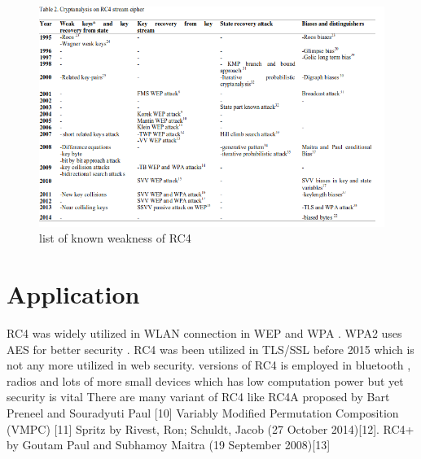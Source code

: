 \documentclass[conference]{IEEEtran}
\begin{document}
\begin{figure}
    \centering
    \includegraphics[width=\linewidth]{Screenshot_2020-09-21 (PDF) A Survey on RC4 Stream Cipher}
    \caption{list of known weakness of RC4}
    \label{fig:my_label}
\end{figure}

\section{Application}
RC4 was widely utilized in WLAN connection in WEP and WPA . WPA2 uses AES for better security . RC4 was been utilized in TLS/SSL before 2015 which is not any more utilized in web security. versions of RC4 is employed in bluetooth , radios and lots of more small devices which has low computation power but yet security is vital 
There are many variant of RC4  like 
RC4A proposed by Bart Preneel and  Souradyuti Paul [10] \newline
Variably Modified Permutation Composition (VMPC) [11]\newline
Spritz by  Rivest, Ron; Schuldt, Jacob (27 October 2014)[12]. \newline
RC4+ by Goutam Paul and Subhamoy Maitra (19 September 2008)[13] \newline \newline \newline \newline \newline 
\end{document}
